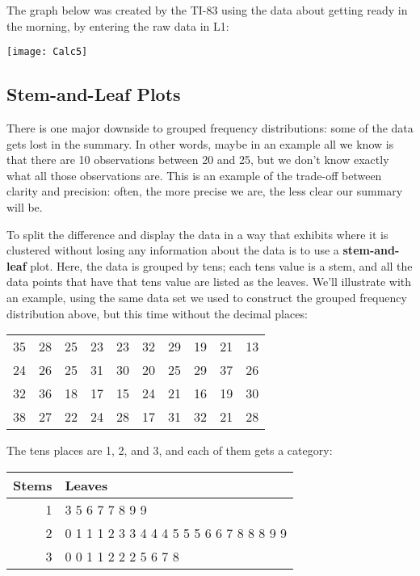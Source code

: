 The graph below was created by the TI-83 using the data about getting ready in the morning, by entering the raw data in L1:
\begin{center}
\texttt{[image: Calc5]}
\end{center}
\vfill
\pagebreak

\subsection{Stem-and-Leaf Plots}
There is one major downside to grouped frequency distributions: some of the data gets lost in the summary.  In other words, maybe in an example all we know is that there are 10 observations between 20 and 25, but we don't know exactly what all those observations are.  This is an example of the trade-off between clarity and precision: often, the more precise we are, the less clear our summary will be.

To split the difference and display the data in a way that exhibits where it is clustered without losing any information about the data is to use a \textbf{stem-and-leaf} plot.  Here, the data is grouped by tens; each tens value is a stem, and all the data points that have that tens value are listed as the leaves.  We'll illustrate with an example, using the same data set we used to construct the grouped frequency distribution above, but this time without the decimal places:
\begin{center}
\begin{tabular}{c c c c c c c c c c}
35 & 28 & 25 & 23 & 23 & 32 & 29 & 19 & 21 & 13\\
24 & 26 & 25 & 31 & 30 & 20 & 25 & 29 & 37 & 26\\
32 & 36 & 18 & 17 & 15 & 24 & 21 & 16 & 19 & 30\\
38 & 27 & 22 & 24 & 28 & 17 & 31 & 32 & 21 & 28\\
\end{tabular}
\end{center}

The tens places are 1, 2, and 3, and each of them gets a category:
\begin{center}
\begin{tabular}{r | l}
Stems & Leaves\\
\hline
1 & {\color{white}3 5 6 7 7 8 9 9}\\
2 & {\color{white}0 1 1 1 2 3 3 4 4 4 5 5 5 6 6 7 8 8 8 9 9}\\
3 & {\color{white}0 0 1 1 2 2 2 5 6 7 8}
\end{tabular}
\end{center}

